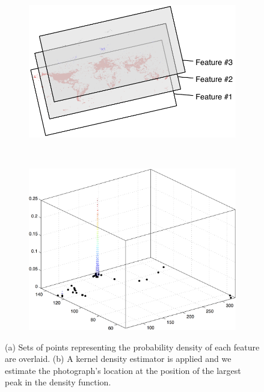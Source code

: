 \documentclass{../acm_proc_article-me11_tweaked}
\begin{document}
\begin{figure}
	\centering
	\begin{subfigure}[b]{0.48\columnwidth}
		\centering
		\includegraphics[width=\columnwidth]{images/layers}
		\caption{}
		\label{fig:features}
	\end{subfigure}
	~
	\begin{subfigure}[b]{0.48\columnwidth}
		\centering
		\includegraphics[width=0.8\columnwidth]{images/density}
		\caption{}
		\label{fig:density}
	\end{subfigure}
	\caption{(a) Sets of points representing the probability density of each feature are overlaid. (b) A kernel density estimator is applied and we estimate the photograph's location at the position of the largest peak in the density function.}
\end{figure}
\end{document}
